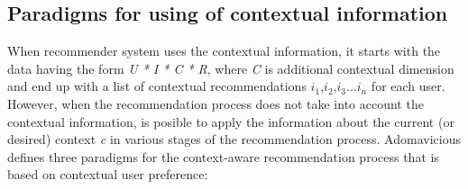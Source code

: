 \subsection{Paradigms for using of contextual information}

When recommender system uses the contextual information, it starts
with the data having the form \textit{U * I * C * R}, where \textit{C}
is additional contextual dimension and end up with a list of
contextual recommendations $i_{1}$,$i_{2}$,$i_{3}$...$i_{n}$ for each
user. However, when the recommendation process does not take into
account  the contextual information, is posible to apply the
information about the current (or desired) context \textit{c} in
various stages of the recommendation process.
Adomavicious \cite{adomavicius2011context} defines three paradigms for
the context-aware recommendation process that is based on contextual
user preference:
